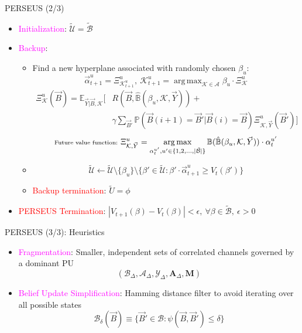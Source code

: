 \documentclass{beamer}
\DeclareMathOperator*{\argmax}{arg\,max}
\begin{document}
\begin{frame}{PERSEUS (2/3)}
    \begin{itemize}
        \item \textcolor{magenta}{Initialization}: $\tilde{\mathcal{U}}{=}\tilde{\mathcal{B}}$
        \item \textcolor{magenta}{Backup}: 
        \begin{itemize}
            \item Find a new hyperplane associated with randomly chosen $\beta_{u}$:
            \[\vec{\alpha}_{t+1}^{u}=\Xi_{\mathcal K_{t+1}^{u}}^{u},\ \mathcal K_{t+1}^{u}=\argmax_{\mathcal{K} \in \mathcal{A}} \beta_u \cdot \Xi_{\mathcal{K}}^{u}\]
            \begin{align*}
                \Xi_{\mathcal{K}}^{u}(\vec{B}) = \mathbb{E}_{\vec{Y}|\vec{B}, \mathcal{K}} \Big[&R(\vec{B}, \hat{\mathbb{B}}(\beta_{u}, \mathcal{K}, \vec{Y}))+\\&\gamma \sum_{\vec{B}'}\mathbb{P}(\vec{B}(i+1){=} \vec{B}'|\vec{B}(i){=}\vec{B})\Xi_{\mathcal{K}, \vec{Y}}^{u}(\vec{B}')\Big]
            \end{align*}
            \[\scriptsize{\text{Future value function: }}\Xi_{\mathcal{K}, \vec{Y}}^{u}=\argmax_{\alpha_{t}^{u'}, u' {\in} \{1, 2, \dots, |\tilde{\mathcal{B}}|\}} \mathbb{B}(\hat{\mathbb{B}}(\beta_{u}, \mathcal{K}, \vec{Y}))\cdot\alpha_{t}^{u'}\]
            \item $$
                    \tilde{\mathcal{U}}\leftarrow \tilde{\mathcal{U}}\setminus\{\beta_u\}\setminus
                    \{\beta'\in\tilde{\mathcal{U}}:\beta'{\cdot}\vec{\alpha}_{t+1}^{u}\geq V_t(\beta')\}
                 $$
            \item \textcolor{red}{Backup termination}: $\tilde{U}{=}\phi$
        \end{itemize}
        \item \textcolor{red}{PERSEUS Termination}: $|V_{t{+}1}(\beta){-}V_{t}(\beta)|{<}\epsilon,\ \forall \beta{\in} \tilde{\mathcal{B}},\ \epsilon{>}0$
    \end{itemize}
\end{frame}
\begin{frame}{PERSEUS (3/3): Heuristics}
    \begin{itemize}
        \item \textcolor{magenta}{Fragmentation}: Smaller, independent sets of correlated channels governed by a dominant PU
        \[(\mathcal{B}_{\Delta},\mathcal{A}_{\Delta},\mathcal{Y}_{\Delta},\mathbf{A}_{\Delta},\mathbf{M})\]
        \item \textcolor{magenta}{Belief Update Simplification}: Hamming distance filter to avoid iterating over all possible states
        \[\mathcal{B}_{\delta}(\vec{B}){\equiv}\{\vec{B}'{\in}\mathcal{B}:\psi(\vec{B},\vec{B}'){\leq}\delta\}\]
    \end{itemize}
\end{frame}
\end{document}
